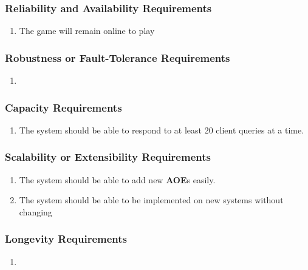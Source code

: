 \documentclass[titlepage]{article}
\begin{document}
		\subsubsection{Reliability and Availability Requirements}
		\label{ssub:reliability_and_availability_requirements}
		\begin{enumerate}[{PR}1. ]
			\item
			The game will remain online to play 
		\end{enumerate}
		
		\subsubsection{Robustness or Fault-Tolerance Requirements}
		\label{ssub:robustness_or_fault_tolerance_requirements}
		\begin{enumerate}[{PR}1. ]
			\item 
		\end{enumerate}
		
		\subsubsection{Capacity Requirements}
		\label{ssub:capacity_requirements}
		\begin{enumerate}[{PR}1. ]
			\item 
			The system should be able to respond to at least 20 client queries at a time.
		\end{enumerate}
		
		\subsubsection{Scalability or Extensibility Requirements}
		\label{ssub:scalability_or_extensibility_requirements}
		\begin{enumerate}
			\item
			The system should be able to add new \textbf{AOE}s easily.
			\item
			The system should be able to be implemented on new systems without changing 
		\end{enumerate}
		
		\subsubsection{Longevity Requirements}
		\label{ssub:longevity_requirements}
		\begin{enumerate}[{PR}1. ]
			\item 
		\end{enumerate}
		
\end{document}
